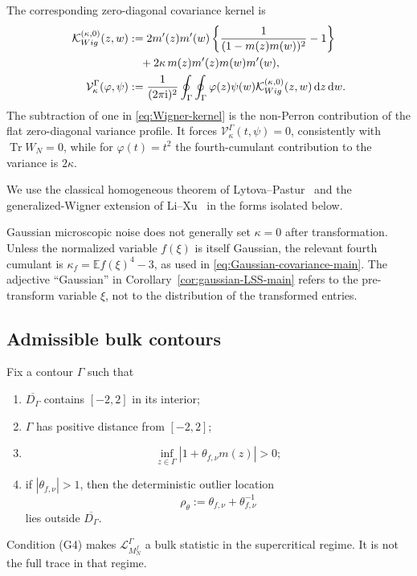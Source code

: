 \documentclass[10pt,a4paper]{amsart}
\newcommand{\E}{\mathbb E}
\newcommand{\Tr}{\operatorname{Tr}}
\newcommand{\ii}{\mathrm i}
\newcommand{\dd}{\mathrm d}
\begin{document}
The corresponding zero-diagonal covariance kernel is
\begin{align}
 \mathcal K_{\rm Wig}^{(\kappa,0)}(z,w)
 &:=2m'(z)m'(w)
 \left\{\frac{1}{(1-m(z)m(w))^2}-1\right\}
 \notag\\
 &\quad+2\kappa\,m(z)m'(z)m(w)m'(w),
 \label{eq:Wigner-kernel}\\
 \mathcal V_\kappa^\Gamma(\varphi,\psi)
 &:=\frac{1}{(2\pi\ii)^2}\oint_\Gamma\oint_\Gamma
 \varphi(z)\psi(w)\mathcal K_{\rm Wig}^{(\kappa,0)}(z,w)
 \,\dd z\,\dd w.
 \label{eq:Wigner-covariance}
\end{align}
The subtraction of one in \eqref{eq:Wigner-kernel} is the non-Perron
contribution of the flat zero-diagonal variance profile.  It forces
\(\mathcal V_\kappa^\Gamma(t,\psi)=0\), consistently with
\(\Tr W_N=0\), while for \(\varphi(t)=t^2\) the fourth-cumulant contribution
to the variance is \(2\kappa\).

We use the classical homogeneous theorem of
Lytova--Pastur~\cite{LytovaPastur2009} and the generalized-Wigner extension of
Li--Xu~\cite{LiXu2021GeneralizedWignerLES} in the forms isolated below.

Gaussian microscopic noise does not generally set \(\kappa=0\) after
transformation.  Unless the normalized variable \(f(\xi)\) is itself Gaussian,
the relevant fourth cumulant is \(\kappa_f=\E f(\xi)^4-3\), as used in
\eqref{eq:Gaussian-covariance-main}.  The adjective ``Gaussian'' in
Corollary~\ref{cor:gaussian-LSS-main} refers to the pre-transform variable
\(\xi\), not to the distribution of the transformed entries.


\subsection{Admissible bulk contours}

Fix a contour \(\Gamma\) such that
\begin{enumerate}[label=(G\arabic*)]
\item \(\overline{D_\Gamma}\) contains \([-2,2]\) in its interior;
\item \(\Gamma\) has positive distance from \([-2,2]\);
\item
\begin{equation}\label{eq:pole-avoidance-package}
 \inf_{z\in\Gamma}|1+\theta_{f,\nu}m(z)|>0;
\end{equation}
\item if \(|\theta_{f,\nu}|>1\), then the deterministic outlier location
\begin{equation}\label{eq:outlier-location-package}
 \rho_{\theta}:=\theta_{f,\nu}+\theta_{f,\nu}^{-1}
\end{equation}
lies outside \(\overline{D_\Gamma}\).
\end{enumerate}
Condition (G4) makes \(\mathcal L_{M_N^f}^\Gamma\) a bulk statistic in the
supercritical regime.  It is not the full trace in that regime.
\end{document}
